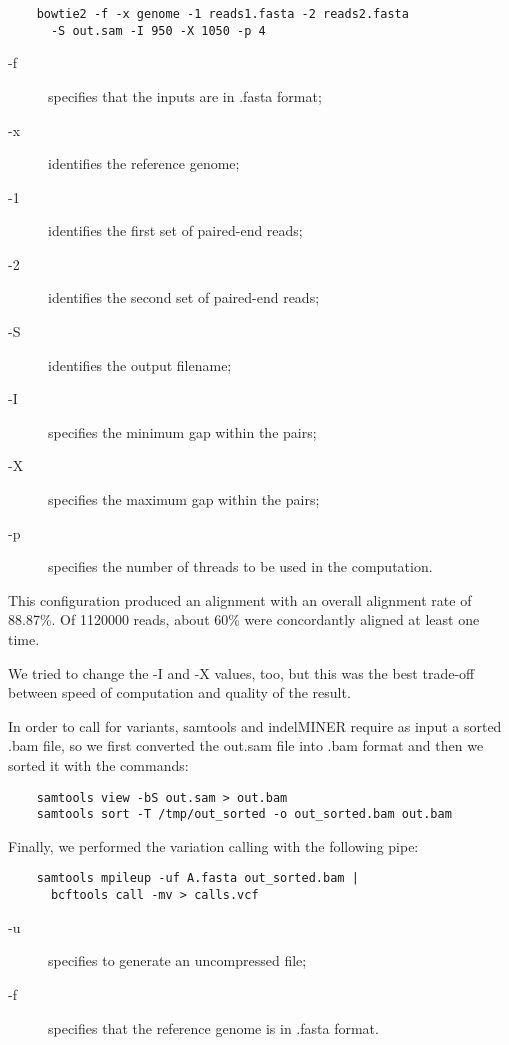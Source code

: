 \documentclass[10pt,a4paper,oneside]{scrartcl}
\begin{document}
	\begin{lstlisting}
	bowtie2 -f -x genome -1 reads1.fasta -2 reads2.fasta
	  -S out.sam -I 950 -X 1050 -p 4
	\end{lstlisting}
	
	\begin{description}
		\item[-f] specifies that the inputs are in .fasta format;
		\item[-x] identifies the reference genome;
		\item[-1] identifies the first set of paired-end reads;
		\item[-2] identifies the second set of paired-end reads;
		\item[-S] identifies the output filename;
		\item[-I] specifies the minimum gap within the pairs;
		\item[-X] specifies the maximum gap within the pairs;
		\item[-p] specifies the number of threads to be used in the computation.
	\end{description}
	
	This configuration produced an alignment with an overall alignment rate of 88.87\%. Of 1120000 reads, about 60\% were concordantly aligned at least one time.
	
	We tried to change the -I and -X values, too, but this was the best trade-off between speed of computation and quality of the result.
 	
	In order to call for variants, samtools and indelMINER require as input a sorted .bam file, so we first converted the out.sam file into .bam format and then we sorted it with the commands:
	
	\begin{lstlisting}
	samtools view -bS out.sam > out.bam
	samtools sort -T /tmp/out_sorted -o out_sorted.bam out.bam
	\end{lstlisting}
	
	Finally, we performed the variation calling with the following pipe:
	
	\begin{lstlisting}
	samtools mpileup -uf A.fasta out_sorted.bam |
	  bcftools call -mv > calls.vcf
	\end{lstlisting}
	
	\begin{description}
		\item[-u] specifies to generate an uncompressed file;
		\item[-f] specifies that the reference genome is in .fasta format.
	\end{description}
	
\end{document}
